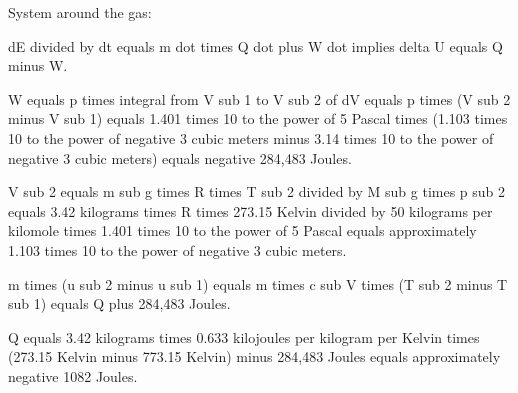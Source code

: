 System around the gas:  

dE divided by dt equals m dot times Q dot plus W dot implies delta U equals Q minus W.  

W equals p times integral from V sub 1 to V sub 2 of dV equals p times (V sub 2 minus V sub 1) equals 1.401 times 10 to the power of 5 Pascal times (1.103 times 10 to the power of negative 3 cubic meters minus 3.14 times 10 to the power of negative 3 cubic meters) equals negative 284,483 Joules.  

V sub 2 equals m sub g times R times T sub 2 divided by M sub g times p sub 2 equals 3.42 kilograms times R times 273.15 Kelvin divided by 50 kilograms per kilomole times 1.401 times 10 to the power of 5 Pascal equals approximately 1.103 times 10 to the power of negative 3 cubic meters.  

m times (u sub 2 minus u sub 1) equals m times c sub V times (T sub 2 minus T sub 1) equals Q plus 284,483 Joules.  

Q equals 3.42 kilograms times 0.633 kilojoules per kilogram per Kelvin times (273.15 Kelvin minus 773.15 Kelvin) minus 284,483 Joules equals approximately negative 1082 Joules.